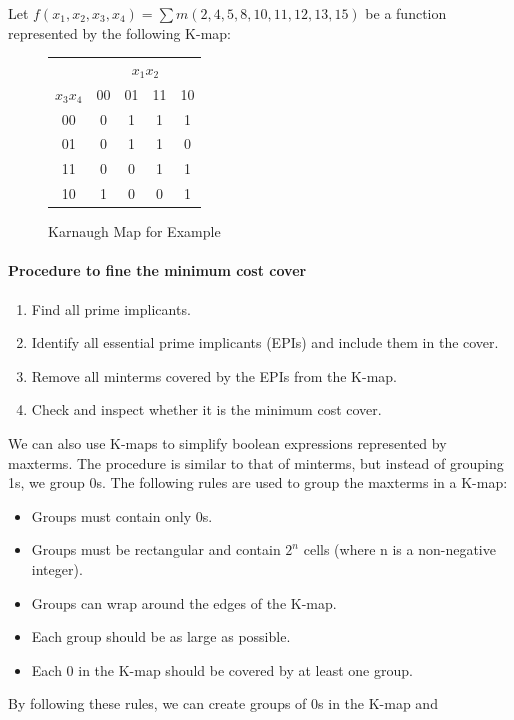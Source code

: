 \documentclass[11pt]{report}
\begin{document}
\begin{example}
    Let $f(x_1, x_2, x_3, x_4) = \sum m(2, 4, 5, 8, 10, 11, 12, 13, 15)$ be a function represented by the following K-map:
    \begin{figure}[h!]
        \centering
        \begin{tabular}{c|c|c|c|c}
            & \multicolumn{4}{c}{$x_1 x_2$} \\
            \cline{2-5}
            $x_3 x_4$ & 00 & 01 & 11 & 10 \\
            \hline
            00 & 0 & 1 & 1 & 1 \\
            01 & 0 & 1 & 1 & 0 \\
            11 & 0 & 0 & 1 & 1 \\
            10 & 1 & 0 & 0 & 1 \\   
        \end{tabular}
        \caption{Karnaugh Map for Example}
        \label{fig:example_karnaugh_map_dont_care}
    \end{figure}

\end{example}



\paragraph{Procedure to fine the minimum cost cover}
\begin{enumerate}
    \item Find all prime implicants.
    \item Identify all essential prime implicants (EPIs) and include them in the cover.
    \item Remove all minterms covered by the EPIs from the K-map.
    \item Check and inspect whether it is the minimum cost cover. 
\end{enumerate}


\begin{definition}
    We can also use K-maps to simplify boolean expressions represented by maxterms. The procedure is similar to that of minterms, but instead of grouping 1s, we group 0s. The following rules are used to group the maxterms in a K-map:
    \begin{itemize}
        \item Groups must contain only 0s.
        \item Groups must be rectangular and contain $2^n$ cells (where n is a non-negative integer).
        \item Groups can wrap around the edges of the K-map.
        \item Each group should be as large as possible.
        \item Each 0 in the K-map should be covered by at least one group.
    \end{itemize}
    By following these rules, we can create groups of 0s in the K-map and
\end{definition}
\end{document}

